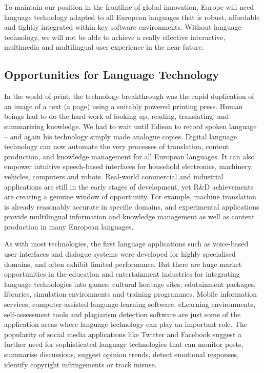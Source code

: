 \documentclass[]{../../metanetpaper}
\begin{document}
\begin{multicols}{2}
    To maintain our position in the frontline of global innovation, Europe will need language technology adapted to all European languages that is robust, affordable and tightly integrated within key software environments. Without language technology, we will not be able to achieve a really effective interactive, multimedia and multilingual user experience in the near future.

\subsection{Opportunities for Language Technology}


    In the world of print, the technology breakthrough was the rapid duplication of an image of a text (a page) using a suitably powered printing press. Human beings had to do the hard work of looking up, reading, translating, and summarizing knowledge. We had to wait until Edison to record spoken language – and again his technology simply made analogue copies.
    Digital language technology can now automate the very processes of translation, content production, and knowledge management for all European languages. It can also empower intuitive speech-based interfaces for household electronics, machinery, vehicles, computers and robots. Real-world commercial and industrial applications are still in the early stages of development, yet R\&D achievements are creating a genuine window of opportunity. For example, machine translation is already reasonably accurate in specific domains, and experimental applications provide multilingual information and knowledge management as well as content production in many European languages. 

    As with most technologies, the first language applications such as voice-based user interfaces and dialogue systems were developed for highly specialised domains, and often exhibit limited performance. But there are huge market opportunities in the education and entertainment industries for integrating language technologies into games, cultural heritage sites, edutainment packages, libraries, simulation environments and training programmes. Mobile information services, computer-assisted language learning software, eLearning environments, self-assessment tools and plagiarism detection software are just some of the application areas where language technology can play an important role. The popularity of social media applications like Twitter and Facebook suggest a further need for sophisticated language technologies that can monitor posts, summarise discussions, suggest opinion trends, detect emotional responses, identify copyright infringements or track misuse.


\end{multicols}
\end{document}

